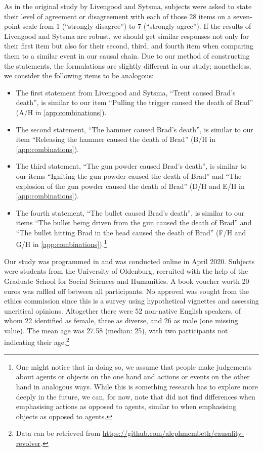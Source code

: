 \documentclass[12pt]{scrartcl}
\begin{document}
As in the original study by Livengood and Sytsma, subjects were asked to state their level of agreement or disagreement with each of those 28 items on a seven-point scale from 1 (\enquote{strongly disagree}) to 7 (\enquote{strongly agree}). If the results of Livengood and Sytsma are robust, we should get similar responses not only for their first item but also for their second, third, and fourth item when comparing them to a similar event in our causal chain. Due to our method of constructing the statements, the formulations are slightly different in our study; nonetheless, we consider the following items to be analogous:
%
\begin{itemize}
   \item The first statement from Livengood and Sytsma, \enquote{Trent caused Brad's death}, is similar to our item \enquote{Pulling the trigger caused the death of Brad} (A/H in \autoref{app:combinations}).
   \item The second statement, \enquote{The hammer caused Brad's death}, is similar to our item \enquote{Releasing the hammer caused the death of Brad} (B/H in \autoref{app:combinations}).
   \item The third statement, \enquote{The gun powder caused Brad's death}, is similar to our items \enquote{Igniting the gun powder caused the death of Brad} and \enquote{The explosion of the gun powder caused the death of Brad} (D/H and E/H in \autoref{app:combinations}).
   \item The fourth statement, \enquote{The bullet caused Brad's death}, is similar to our items \enquote{The bullet being driven from the gun caused the death of Brad} and \enquote{The bullet hitting Brad in the head caused the death of Brad} (F/H and G/H in \autoref{app:combinations}).\footnote{One might notice that in doing so, we assume that people make judgements about agents or objects on the one hand and actions or events on the other hand in analogous ways. While this is something research has to explore more deeply in the future, we can, for now, note that \citet*{livengood_following_2017} did not find differences when emphasising actions as opposed to agents, similar to \citet*{livengood_actual_2020} when emphasising objects as opposed to agents.}
\end{itemize}
%
Our study was programmed in \cite{limesurvey_project_team_limesurvey_2020} and was conducted online in April 2020. Subjects were students from the University of Oldenburg, recruited with the help of the Graduate School for Social Sciences and Humanities. A book voucher worth 20 euros was raffled off between all participants. No approval was sought from the ethics commission since this is a survey using hypothetical vignettes and assessing uncritical opinions. Altogether there were 52 non-native English speakers, of whom 22 identified as female, three as diverse, and 26 as male (one missing value). The mean age was 27.58 (median: 25), with two participants not indicating their age.\footnote{Data can be retrieved from \url{https://github.com/alephmembeth/causality-revolver}.}
\end{document}
